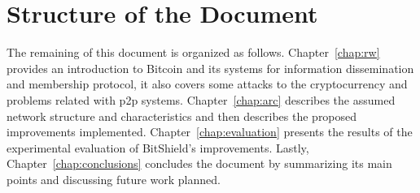 \section{Structure of the Document}
\label{chap:sotd}

The remaining of this document is organized as follows. Chapter~\ref{chap:rw} provides an introduction to Bitcoin and its systems for information dissemination and membership protocol, it also covers some attacks to the cryptocurrency and problems related with \acrlong{p2p} systems. Chapter~\ref{chap:arc} describes the assumed network structure and characteristics and then describes the proposed improvements implemented. Chapter~\ref{chap:evaluation} presents the results of the experimental evaluation of BitShield's improvements. Lastly, Chapter~\ref{chap:conclusions} concludes the document by summarizing its main points and discussing future work planned.


